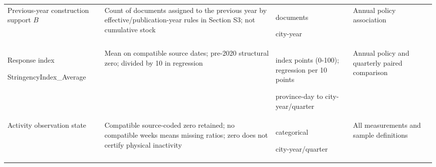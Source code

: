 \begin{longtable}{@{}>{\raggedright\arraybackslash}p{30mm}>{\raggedright\arraybackslash}p{48mm}>{\raggedright\arraybackslash}p{30mm}>{\raggedright\arraybackslash}p{44mm}@{}}
Previous-year construction support $B$ & Count of documents assigned to the previous year by effective/publication-year rules in Section S3; not cumulative stock & documents\par city-year & Annual policy association\\[3pt]
Response index\par StringencyIndex\_\allowbreak{}Average & Mean on compatible source dates; pre-2020 structural zero; divided by 10 in regression & index points (0-100); regression per 10 points\par province-day to city-year/\allowbreak{}quarter & Annual policy and quarterly paired comparison\\[3pt]
Activity observation state & Compatible source-coded zero retained; no compatible weeks means missing ratios; zero does not certify physical inactivity & categorical\par city-year/\allowbreak{}quarter & All measurements and sample definitions\\[3pt]
\end{longtable}\endgroup

